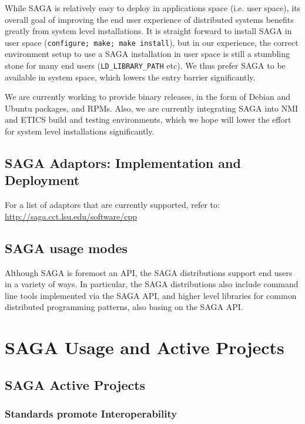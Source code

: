 \documentclass[12pt]{article}
\newcommand{\T}[1]{\texttt{#1}}
\begin{document}
  While SAGA is relatively easy to deploy in applications space (i.e.
  user space), its overall goal of improving the end user experience
  of distributed systems benefits greatly from system level
  installations.  It is straight forward to install SAGA in user space
  (\T{configure; make; make install}), but in our experience, the
  correct environment setup to use a SAGA installation in user space
  is still a stumbling stone for many end users (\T{LD\_LIBRARY\_PATH}
  etc).  We thus prefer SAGA to be available in system space, which
  lowers the entry barrier significantly.  

  We are currently working to provide binary releases, in the form of
  Debian and Ubuntu packages, and RPMs.  Also, we are currently
  integrating SAGA into NMI and ETICS build and testing environments,
  which we hope will lower the effort for system level installations
  significantly.


  \subsection{SAGA Adaptors: Implementation and Deployment}

 For a list of adaptors that are currently supported, refer to:
 \url{http://saga.cct.lsu.edu/software/cpp}

 \subsection{SAGA usage modes}

 Although SAGA is foremost an API, the SAGA distributions support end
 users in a variety of ways.  In particular, the SAGA distributions
 also include command line tools implemented via the SAGA API, and
 higher level libraries for common distributed programming patterns,
 also basing on the SAGA API.


\section{SAGA Usage and Active Projects}

\subsection{SAGA Active Projects}

 \subsubsection{Standards promote Interoperability}
\end{document}
